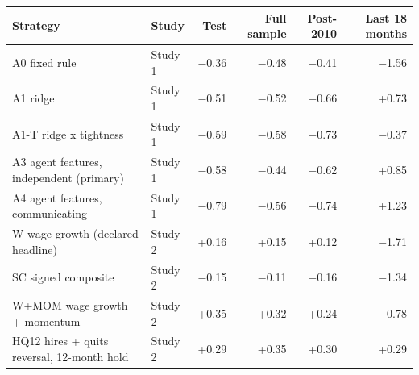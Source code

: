 \begin{tabular}{llrrrr}
\toprule
Strategy & Study & Test & Full sample & Post-2010 & Last 18 months \\
\midrule
A0 fixed rule & Study 1 & $-$0.36 & $-$0.48 & $-$0.41 & $-$1.56 \\
A1 ridge & Study 1 & $-$0.51 & $-$0.52 & $-$0.66 & +0.73 \\
A1-T ridge x tightness & Study 1 & $-$0.59 & $-$0.58 & $-$0.73 & $-$0.37 \\
A3 agent features, independent (primary) & Study 1 & $-$0.58 & $-$0.44 & $-$0.62 & +0.85 \\
A4 agent features, communicating & Study 1 & $-$0.79 & $-$0.56 & $-$0.74 & +1.23 \\
W wage growth (declared headline) & Study 2 & +0.16 & +0.15 & +0.12 & $-$1.71 \\
SC signed composite & Study 2 & $-$0.15 & $-$0.11 & $-$0.16 & $-$1.34 \\
W+MOM wage growth + momentum & Study 2 & +0.35 & +0.32 & +0.24 & $-$0.78 \\
HQ12 hires + quits reversal, 12-month hold & Study 2 & +0.29 & +0.35 & +0.30 & +0.29 \\
\bottomrule
\end{tabular}
